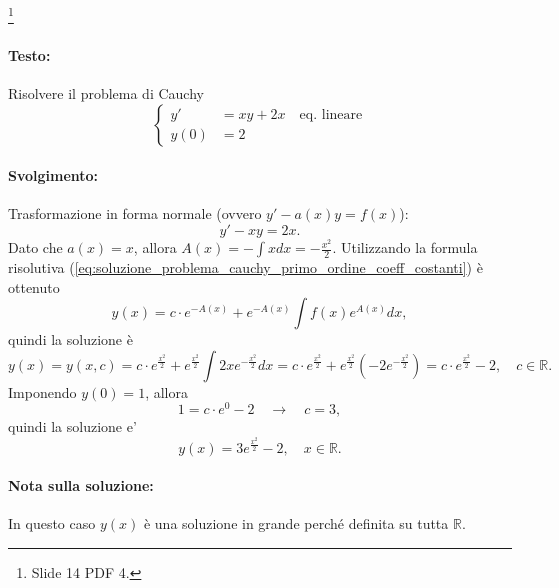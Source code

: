 \begin{example}\footnote{Slide 14 PDF 4.}
    \paragraph{Testo:} Risolvere il problema di Cauchy
    \begin{equation*}
        \begin{cases}
            y' &=xy+2x\quad\text{eq. lineare}\\
            y(0)& = 2
        \end{cases}
    \end{equation*}
    \paragraph{Svolgimento:} Trasformazione in forma normale (ovvero $y'-a(x)y=f(x)$):
    \begin{equation*}
        y'-xy = 2x.
    \end{equation*}
    Dato che $a(x)=x$, allora $A(x)=-\int xdx=-\frac{x^2}{2}$. Utilizzando la formula risolutiva (\ref{eq:soluzione_problema_cauchy_primo_ordine_coeff_costanti}) è ottenuto
    \begin{equation*}
        y(x) = c\cdot e^{-A(x)} + e^{-A(x)}\int f(x) e^{A(x)} dx,
    \end{equation*}
    quindi la soluzione è
    \begin{equation*}
        y(x)=y(x,c)= c\cdot e^{\frac{x^2}{2}}+ e^{\frac{x^2}{2}}\int 2xe^{-\frac{x^2}{2}}dx = c\cdot e^{\frac{x^2}{2}}+ e^{\frac{x^2}{2}}\left(-2 e^{-\frac{x^2}{2}}\right)=c\cdot e^{\frac{x^2}{2}}-2,\quad c\in\mathbb R.
    \end{equation*}
    Imponendo $y(0)=1$, allora
    \begin{equation*}
        1=c\cdot e^{0} -2\quad \rightarrow\quad c = 3,
    \end{equation*}
    quindi la soluzione e'
    \begin{equation*}
        y(x) = 3e^{\frac{x^2}{2}}-2,\quad x\in\mathbb R.
    \end{equation*}
    \paragraph{Nota sulla soluzione:} In questo caso $y(x)$ è una soluzione in grande perché definita su tutta $\mathbb R$.
\end{example}

